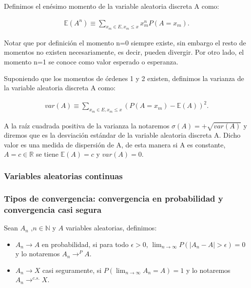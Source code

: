 \documentclass[../proyecto.tex]{memoir}
\begin{document}
Definimos el enésimo momento de la variable aleatoria discreta A como:

\begin{align*}
\mathds{E}(A^n) \equiv \sum_{x_m \in E, x_m \leq x} x_m^n P(A=x_m).
\end{align*}

Notar que por definición el momento n=0 siempre existe, sin embargo el resto de momentos no existen necesariamente, es decir, pueden divergir. Por otro lado, el momento n=1 se conoce como valor esperado o esperanza.

Suponiendo que los momentos de órdenes 1 y 2 existen, definimos la varianza de la variable aleatoria discreta A como:

\begin{align*}
var(A) \equiv \sum_{x_m\in E, x_m \leq x} (P(A=x_m) - \mathds{E}(A))^2.
\end{align*}

A la raíz cuadrada positiva de la varianza la notaremos $\sigma(A)=+\sqrt{var(A)}$ y diremos que es la desviación estándar de la variable aleatoria discreta A. Dicho valor es una medida de dispersión de A, de esta manera si A es constante, $A = c\in \mathds{R}$ se tiene $\mathds{E}(A)=c$ y $var(A) = 0$.

\subsubsection{Variables aleatorias continuas}





\subsubsection{Tipos de convergencia: convergencia en probabilidad y convergencia casi segura}

Sean ${A_n}$ ,$n\in \mathds{N}$ y $A$ variables aleatorias, definimos:

\begin{itemize}

\item $A_n \to A$ en probabilidad, si para todo $\epsilon > 0$, $\lim_{n\to\infty} P( |A_n-A|> \epsilon ) = 0$ y lo notaremos $A_n \to^{P} A$.

\item $A_n \to X$ casi seguramente, si $P(\lim_{n\to\infty} A_n=A) = 1$ y lo notaremos $A_n \to^{c.s.} X$.

\end{itemize}
\end{document}
